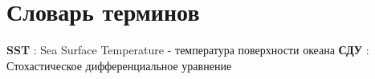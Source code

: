 \chapter*{Словарь терминов}             %

\textbf{SST} : Sea Surface Temperature - температура поверхности океана
\textbf{СДУ} : Стохастическое дифференциальное уравнение
